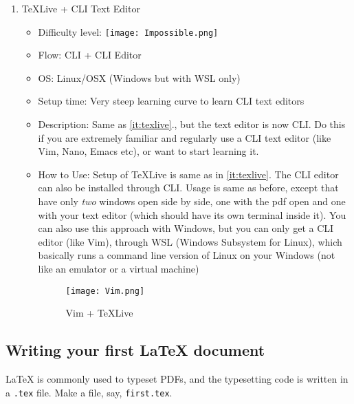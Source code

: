 \documentclass[12pt, letterpaper]{article}
\theoremstyle{remark}
\begin{document}
\begin{enumerate}
        \item TeXLive + CLI Text Editor
        \begin{itemize}
            \item Difficulty level: \texttt{[image: Impossible.png]}
            \item Flow: CLI + CLI Editor
            \item OS: Linux/OSX (Windows but with WSL only)
            \item Setup time: Very steep learning curve to learn CLI text editors
            \item Description: Same as \ref{it:texlive}., but the text editor is now CLI. Do this if you are extremely familiar and regularly use a CLI text editor (like Vim, Nano, Emacs etc), or want to start learning it.
            \item How to Use: Setup of TeXLive is same as in \ref{it:texlive}. The CLI editor can also be installed through CLI. Usage is same as before, except that have only \textit{two} windows open side by side, one with the pdf open and one with your text editor (which should have its own terminal inside it). You can also use this approach with Windows, but you can only get a CLI editor (like Vim), through WSL (Windows Subsystem for Linux), which basically runs a command line version of Linux on your Windows (not like an emulator or a virtual machine)
            \begin{figure}[h]
                \centering
                \texttt{[image: Vim.png]}
                \caption{Vim + TeXLive}
                \label{fig:vim}
            \end{figure}
        \end{itemize}
\end{enumerate}

\subsection{Writing your first \LaTeX{} document}
\LaTeX{} is commonly used to typeset PDFs, and the typesetting code is written in a \verb!.tex! file. Make a file, say, \verb!first.tex!. 
\end{document}
